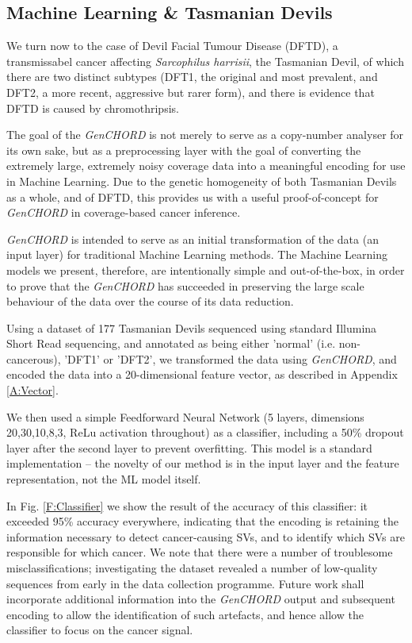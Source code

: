 \documentclass[fleqn,usenatbib]{acmart}
\def\codename{\textit{GenCHORD}}
\begin{document}
			{
			\subsection{Machine Learning \& Tasmanian Devils}

				We turn now to the case of Devil Facial Tumour Disease (DFTD), a transmissabel cancer affecting \textit{Sarcophilus harrisii}, the Tasmanian Devil\cite{Murchison2008,Murchison2012}, of which there are two distinct subtypes (DFT1, the original and most prevalent, and DFT2, a more recent, aggressive but rarer form)\cite{DFT22016}, and there is evidence that DFTD is caused by chromothripsis\cite{Deakin2012,Stammnitz2023}. 

				The goal of the \codename{} is not merely to serve as a copy-number analyser for its own sake, but as a preprocessing layer with the goal of converting the extremely large, extremely noisy coverage data into a meaningful encoding for use in Machine Learning. 	Due to the genetic homogeneity of both Tasmanian Devils as a whole, and of DFTD, this provides us with a useful proof-of-concept for \codename{} in coverage-based cancer inference.
				
				
				\codename{} is intended to serve as an initial transformation of the data (an input layer) for traditional Machine Learning methods. The Machine Learning models we present, therefore, are intentionally simple and out-of-the-box, in order to prove that the \codename{} has succeeded in preserving the large scale behaviour of the data over the course of its data reduction. 

				Using a dataset of 177 Tasmanian Devils\cite{Stammnitz2023} sequenced using standard Illumina Short Read sequencing, and annotated as being either 'normal' (i.e. non-cancerous), 'DFT1' or 'DFT2', we transformed the data using \codename{}, and encoded the data into a 20-dimensional feature vector, as described in Appendix \ref{A:Vector}.

				We then used a simple Feedforward Neural Network (5 layers, dimensions 20,30,10,8,3, ReLu activation throughout) as a classifier, including a 50\% dropout layer after the second layer to prevent overfitting. This model is a standard implementation -- the novelty of our method is in the input layer and the feature representation, not the ML model itself.

				In Fig. \ref{F:Classifier} we show the result of the accuracy of this classifier: it exceeded 95\% accuracy everywhere, indicating that the encoding is retaining the information necessary to detect cancer-causing SVs, and to identify which SVs are responsible for which cancer. We note that there were a number of troublesome misclassifications; investigating the dataset revealed a number of low-quality sequences from early in the data collection programme. Future work shall incorporate additional information into the \codename{} output and subsequent encoding to allow the identification of such artefacts, and hence allow the classifier to focus on the cancer signal. 

}
\end{document}
